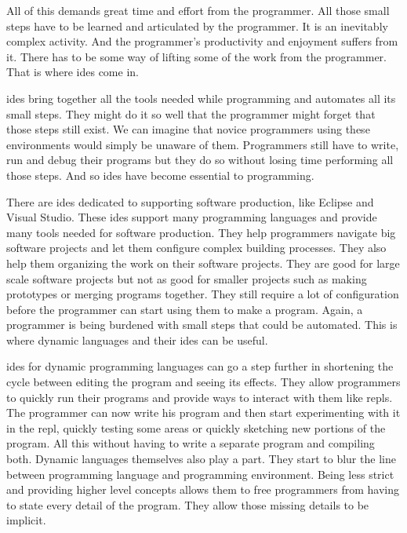 \documentclass{./llncs2e/llncs}
\begin{document}
	All of this demands great time and effort from the programmer.
	All those small steps have to be learned and articulated by the programmer.
	It is an inevitably complex activity.
	And the programmer's productivity and enjoyment suffers from it.
	There has to be some way of lifting some of the work from the programmer.
	That is where \ac{ide}s come in.

	\ac{ide}s bring together all the tools needed while programming and automates all its small steps.
	They might do it so well that the programmer might forget that those steps still exist.
	We can imagine that novice programmers using these environments would simply be unaware of them.
	Programmers still have to write, run and debug their programs but they do so without losing time performing all those steps.
	And so \ac{ide}s have become essential to programming.
	
	There are \ac{ide}s dedicated to supporting software production, like Eclipse and Visual Studio.
	These \ac{ide}s support many programming languages and provide many tools needed for software production.
	They help programmers navigate big software projects and let them configure complex building processes.
	They also help them organizing the work on their software projects.
	They are good for large scale software projects but not as good for smaller projects such as making prototypes or merging programs together.
	They still require a lot of configuration before the programmer can start using them to make a program.
	Again, a programmer is being burdened with small steps that could be automated.
	This is where dynamic languages and their \ac{ide}s can be useful.

	\ac{ide}s for dynamic programming languages can go a step further in shortening the cycle between editing the program and seeing its effects.
	They allow programmers to quickly run their programs and provide ways to interact with them like \ac{repl}s.
	The programmer can now write his program and then start experimenting with it in the \ac{repl}, quickly testing some areas or quickly sketching new portions of the program.
	All this without having to write a separate program and compiling both.
	Dynamic languages themselves also play a part.
	They start to blur the line between programming language and programming environment.
	Being less strict and providing higher level concepts allows them to free programmers from having to state every detail of the program.
	They allow those missing details to be implicit.
\end{document}
